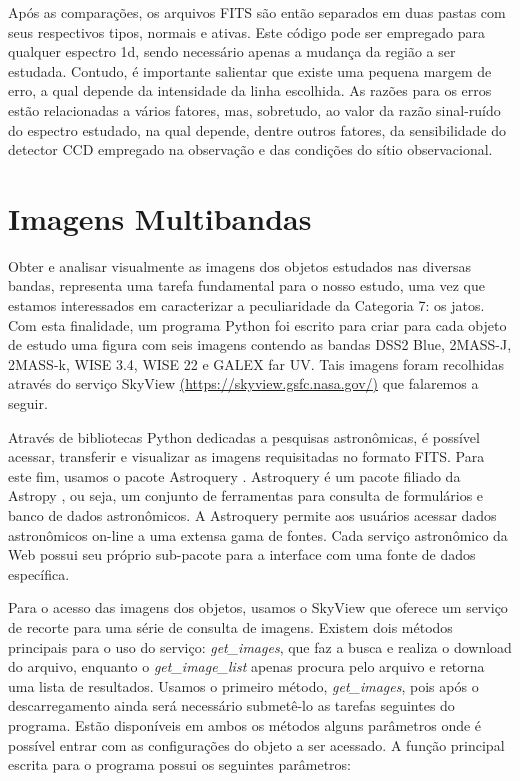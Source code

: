 Após as comparações, os arquivos FITS são então separados em duas pastas com seus respectivos tipos, normais e ativas. Este código pode ser empregado para qualquer espectro 1d, sendo necessário apenas a mudança da região a ser estudada. Contudo, é importante salientar que existe uma pequena margem de erro, a qual depende da intensidade da linha escolhida. As razões para os erros estão relacionadas a vários fatores, mas, sobretudo, ao valor da razão sinal-ruído do espectro estudado, na qual depende, dentre outros fatores, da sensibilidade do detector CCD empregado na observação e das condições do sítio observacional.

\section{Imagens Multibandas}
\label{subsec:image_mult}

Obter e analisar visualmente as imagens dos objetos estudados nas diversas bandas, representa uma tarefa fundamental para o nosso estudo, uma vez que estamos interessados em caracterizar a peculiaridade da Categoria 7: os jatos. Com esta finalidade, um programa Python foi escrito para criar para cada objeto de estudo uma figura com seis imagens contendo as bandas DSS2 Blue, 2MASS-J, 2MASS-k, WISE 3.4, WISE 22 e GALEX far UV. Tais imagens foram recolhidas através do serviço SkyView \url{(https://skyview.gsfc.nasa.gov/)} que falaremos a seguir.

Através de bibliotecas Python dedicadas a pesquisas astronômicas, é possível acessar, transferir e visualizar as imagens requisitadas no formato FITS. Para este fim, usamos o pacote Astroquery \cite{sipocz2016astroquery}. Astroquery é um pacote filiado da Astropy \cite{robitaille2013astropy}, ou seja, um conjunto de ferramentas para consulta de formulários e banco de dados astronômicos. A Astroquery permite aos usuários acessar dados astronômicos on-line a uma extensa gama de fontes. Cada serviço astronômico da Web possui seu próprio sub-pacote para a interface com uma fonte de dados específica. 

Para o acesso das imagens dos objetos, usamos o SkyView que oferece um serviço de recorte para uma série de consulta de imagens. Existem dois métodos principais para o uso do serviço: \textit{get\_images}, que faz a busca e realiza o download do arquivo, enquanto o  \textit{get\_image\_list} apenas procura pelo arquivo e retorna uma lista de resultados. Usamos o primeiro método, \textit{get\_images}, pois após o descarregamento ainda será necessário submetê-lo as tarefas seguintes do programa. Estão disponíveis em ambos os métodos alguns parâmetros onde é possível entrar com as configurações do objeto a ser acessado. A função principal escrita para o programa possui os seguintes parâmetros:

